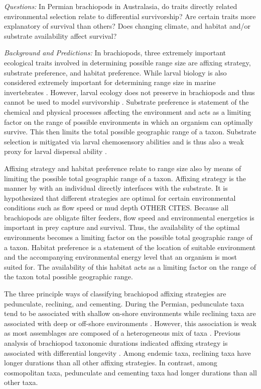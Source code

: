 \documentclass[12pt,letterpaper]{article}
\begin{document}
\textit{Questions:} In Permian brachiopods in Australasia, do traits directly related environmental selection relate to differential survivorship? Are certain traits more explanatory of survival than others? Does changing climate, and habitat and/or substrate availability affect survival?

\textit{Background and Predictions:}
In brachiopods, three extremely important ecological traits involved in determining possible range size are affixing strategy, substrate preference, and habitat preference. While larval biology is also considered extremely important for determining range size in marine invertebrates \citep{Jablonski2006a,Jablonski1983}. However, larval ecology does not preserve in brachiopods and thus cannot be used to model survivorship \citep{Jablonski1983}. Substrate preference is statement of the chemical and physical processes affecting the environment and acts as a limiting factor on the range of possible environments in which an organism can optimally survive. This then limits the total possible geographic range of a taxon. Substrate selection is mitigated via larval chemosensory abilities and is thus also a weak proxy for larval dispersal ability \citep{Jablonski2006a,Jablonski1983}. 

Affixing strategy and habitat preference relate to range size also by means of limiting the possible total geographic range of a taxon. Affixing strategy is the manner by with an individual directly interfaces with the substrate. It is hypothesized that different strategies are optimal for certain environmental conditions such as flow speed or mud depth \citep{Alexander1977} OTHER CITES. Because all brachiopods are obligate filter feeders, flow speed and environmental energetics is important in prey capture and survival. Thus, the availability of the optimal environments becomes a limiting factor on the possible total geographic range of a taxon. Habitat preference is a statement of the location of suitable environment and the accompanying environmental energy level that an organism is most suited for. The availability of this habitat acts as a limiting factor on the range of the taxon total possible geographic range. 

The three principle ways of classifying brachiopod affixing strategies are pedunculate, reclining, and cementing. During the Permian, pedunculate taxa tend to be associated with shallow on-shore environments while reclining taxa are associated with deep or off-shore environments \citep{Clapham2007}. However, this association is weak as most assemblages are composed of a heterogeneous mix of taxa \citep{Clapham2007}. Previous analysis of brachiopod taxonomic durations indicated affixing strategy is associated with differential longevity \citep{Alexander1977}. Among endemic taxa, reclining taxa have longer durations than all other affixing strategies. In contrast, among cosmopolitan taxa, pedunculate and cementing taxa had longer durations than all other taxa. 
\end{document}
